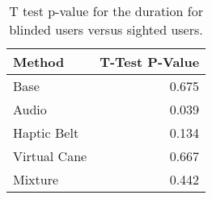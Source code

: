 
\begin{table}[!htb]
\centering
\caption{T test p-value for the duration for blinded users versus sighted users.}
\label{tab:ttest_duration}
\begin{tabular}{lr}
\toprule
      Method &  T-Test P-Value \\
\midrule
        Base &           0.675 \\
       Audio &           0.039 \\
 Haptic Belt &           0.134 \\
Virtual Cane &           0.667 \\
     Mixture &           0.442 \\
\bottomrule
\end{tabular}
\end{table}

